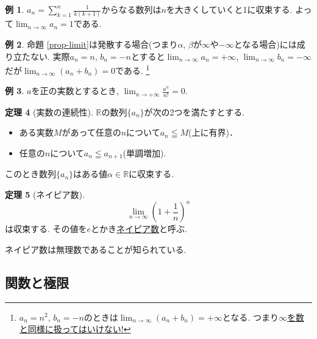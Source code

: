 \documentclass[dvipdfmx,a4paper,11pt]{article}
\newcommand{\R}{\mathbb{R}}
\theoremstyle{definition}
\newtheorem{thm}{定理}
\newtheorem{exa}[thm]{例}
\begin{document}
  \begin{exa}
 $a_n = \sum_{k=1}^{n}\frac{1}{k(k+1)}$からなる数列は$n$を大きくしていくと1に収束する. よって$\lim_{n \to \infty}a_n =1$である.
\end{exa}

   \begin{exa}
  命題 \ref{prop-limit}は発散する場合(つまり$\alpha$, $\beta$が$\infty$や$- \infty$となる場合)には成り立たない. 
実際$a_n = n$, $b_n=-n$とすると$\lim_{n \to \infty}a_n=+ \infty$, $\lim_{n \to \infty}b_n=- \infty$だが$\lim_{n \to \infty} \left(a_n + b_n\right) =0$である.
\footnote{$a_n = n^2$, $b_n=-n$のときは$\lim_{n \to \infty} \left(a_n + b_n\right) = + \infty$となる. つまり\underline{$\infty$を数と同様に扱ってはいけない!}}
\end{exa}



  \begin{exa}
  \label{exa-frac}
$a$を正の実数とするとき,  $\lim_{n \to + \infty}\frac{a^n}{n!} =0$.
  \end{exa}
 


 \begin{tcolorbox}[
    colback = white,
    colframe = green!35!black,
    fonttitle = \bfseries,
    breakable = true]
    \begin{thm}[実数の連続性]
    \label{realconti}
$\R$の数列$\{ a_n \}$が次の2つを満たすとする. 
 \begin{itemize}
   \setlength{\parskip}{0cm} 
  \setlength{\itemsep}{0cm}
  \item ある実数$M$があって任意の$n$について$a_n \leqq M$(上に有界)．
  \item 任意の$n$について$a_n \leqq a_{n+1}$(単調増加).
  \end{itemize}
  このとき数列$\{ a_n \}$はある値$\alpha \in \R$に収束する.
 \end{thm}
  \end{tcolorbox}
  
    
  \begin{tcolorbox}[
    colback = white,
    colframe = green!35!black,
    fonttitle = \bfseries,
    breakable = true]
 \begin{thm}[ネイピア数]
 $$
 \lim_{n \to \infty} \left( 1 + \frac{1}{n}\right)^{n}
 $$
 は収束する. その値を$e$とかき\underline{ネイピア数}と呼ぶ.
  \end{thm}
   \end{tcolorbox}
ネイピア数は無理数であることが知られている. 
\subsection{関数と極限}
\end{document}
